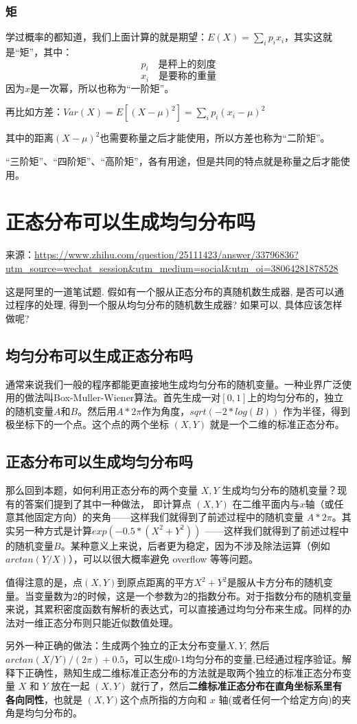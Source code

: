 \documentclass[12pt]{article}
\begin{document}
\subsubsection{矩}
学过概率的都知道，我们上面计算的就是期望：$E(X) = \sum_ip_ix_i$，其实这就是“矩”，其中：
$$
p_i \quad \textbf{是秤上的刻度}
$$
$$
x_i \quad \textbf{是要称的重量}
$$
因为$x$是一次幂，所以也称为“一阶矩”。

再比如方差：$Var(X) = E[(X-\mu)^2] = \sum_ip_i(x_i-\mu)^2 $

其中的距离$(X-\mu)^2$也需要称量之后才能使用，所以方差也称为“二阶矩”。

“三阶矩”、“四阶矩”、“高阶矩”，各有用途，但是共同的特点就是称量之后才能使用。

\section{正态分布可以生成均匀分布吗}
来源：\url{https://www.zhihu.com/question/25111423/answer/33796836?utm_source=wechat_session&utm_medium=social&utm_oi=38064281878528}

这是阿里的一道笔试题. 假如有一个服从正态分布的真随机数生成器, 是否可以通过程序的处理, 得到一个服从均匀分布的随机数生成器? 如果可以, 具体应该怎样做呢? 

\subsection{均匀分布可以生成正态分布吗}
通常来说我们一般的程序都能更直接地生成均匀分布的随机变量。一种业界广泛使用的做法叫Box-Muller-Wiener算法。首先生成一对$[0,1]$上的均匀分布的，独立的随机变量$A$和$B$。然后用$A *2\pi $作为角度，$sqrt(-2*log(B))$ 作为半径，得到极坐标下的一个点。这个点的两个坐标 $(X,Y)$ 就是一个二维的标准正态分布。

\subsection{正态分布可以生成均匀分布吗}
那么回到本题，如何利用正态分布的两个变量 $X,Y$ 生成均匀分布的随机变量？现有的答案们提到了其中一种做法， 即计算点 $(X,Y)$ 在二维平面内与$x$轴（或任意其他固定方向）的夹角——这样我们就得到了前述过程中的随机变量 $A * 2\pi$。其实另一种方式是计算$exp( -0.5 * (X^2 + Y^2))$ ——这样我们就得到了前述过程中的随机变量$B$。某种意义上来说，后者更为稳定，因为不涉及除法运算（例如$arctan(Y/X)$），可以以很大概率避免 overflow 等等问题。

值得注意的是，点$(X,Y)$到原点距离的平方$X^2 + Y^2$是服从卡方分布的随机变量。当变量数为2的时候，这是一个参数为2的指数分布。对于指数分布的随机变量来说，其累积密度函数有解析的表达式，可以直接通过均匀分布来生成。同样的办法对一维正态分布则只能近似数值处理。

另外一种正确的做法：生成两个独立的正太分布变量$X,Y$, 然后$arctan(X/Y)/(2\pi)+0.5$，可以生成0-1均匀分布的变量,已经通过程序验证。解释下正确性，熟知生成二维标准正态分布的方法就是取两个独立的标准正态分布变量 $X$ 和 $Y$ 放在一起 $(X, Y)$ 就行了，然后\textbf{二维标准正态分布在直角坐标系里有各向同性}，也就是 $(X, Y)$这个点所指的方向和 $x$ 轴(或者任何一个给定方向)的夹角是均匀分布的。




\end{document}
